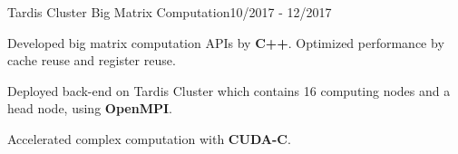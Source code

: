 \begin{rSubsection}{Tardis Cluster Big Matrix Computation}{10/2017 - 12/2017}{}{}
\item Developed big matrix computation APIs by {\bf C++}. Optimized performance by cache reuse and register reuse.
\item Deployed back-end on Tardis Cluster which contains 16 computing nodes and a head node, using {\bf OpenMPI}.
\item Accelerated complex computation with {\bf  CUDA-C}.
\end{rSubsection}